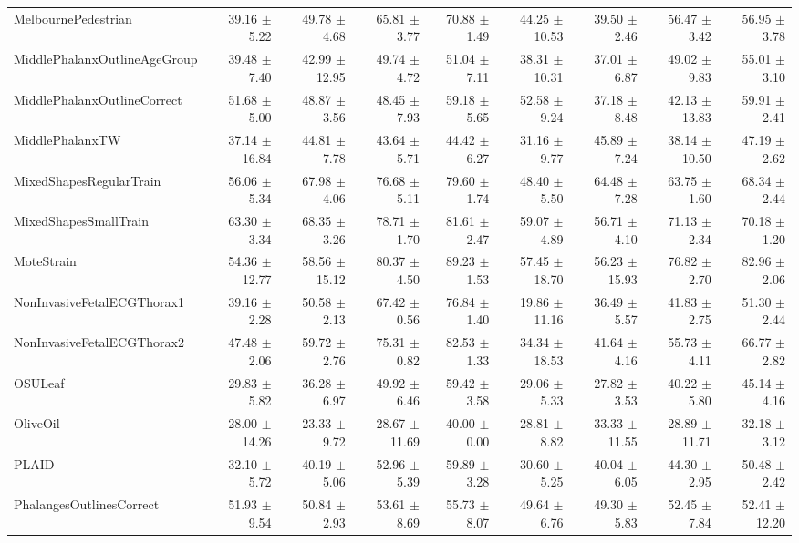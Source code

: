 \begin{landscape}
\begin{longtable}{lrrrrrrrr}
MelbournePedestrian & 39.16 $\pm$ 5.22 & 49.78 $\pm$ 4.68 & 65.81 $\pm$ 3.77 & 70.88 $\pm$ 1.49 & 44.25 $\pm$ 10.53 & 39.50 $\pm$ 2.46 & 56.47 $\pm$ 3.42 & 56.95 $\pm$ 3.78 \\
MiddlePhalanxOutlineAgeGroup & 39.48 $\pm$ 7.40 & 42.99 $\pm$ 12.95 & 49.74 $\pm$ 4.72 & 51.04 $\pm$ 7.11 & 38.31 $\pm$ 10.31 & 37.01 $\pm$ 6.87 & 49.02 $\pm$ 9.83 & 55.01 $\pm$ 3.10 \\
MiddlePhalanxOutlineCorrect & 51.68 $\pm$ 5.00 & 48.87 $\pm$ 3.56 & 48.45 $\pm$ 7.93 & 59.18 $\pm$ 5.65 & 52.58 $\pm$ 9.24 & 37.18 $\pm$ 8.48 & 42.13 $\pm$ 13.83 & 59.91 $\pm$ 2.41 \\
MiddlePhalanxTW & 37.14 $\pm$ 16.84 & 44.81 $\pm$ 7.78 & 43.64 $\pm$ 5.71 & 44.42 $\pm$ 6.27 & 31.16 $\pm$ 9.77 & 45.89 $\pm$ 7.24 & 38.14 $\pm$ 10.50 & 47.19 $\pm$ 2.62 \\
MixedShapesRegularTrain & 56.06 $\pm$ 5.34 & 67.98 $\pm$ 4.06 & 76.68 $\pm$ 5.11 & 79.60 $\pm$ 1.74 & 48.40 $\pm$ 5.50 & 64.48 $\pm$ 7.28 & 63.75 $\pm$ 1.60 & 68.34 $\pm$ 2.44 \\
MixedShapesSmallTrain & 63.30 $\pm$ 3.34 & 68.35 $\pm$ 3.26 & 78.71 $\pm$ 1.70 & 81.61 $\pm$ 2.47 & 59.07 $\pm$ 4.89 & 56.71 $\pm$ 4.10 & 71.13 $\pm$ 2.34 & 70.18 $\pm$ 1.20 \\
MoteStrain & 54.36 $\pm$ 12.77 & 58.56 $\pm$ 15.12 & 80.37 $\pm$ 4.50 & 89.23 $\pm$ 1.53 & 57.45 $\pm$ 18.70 & 56.23 $\pm$ 15.93 & 76.82 $\pm$ 2.70 & 82.96 $\pm$ 2.06 \\
NonInvasiveFetalECGThorax1 & 39.16 $\pm$ 2.28 & 50.58 $\pm$ 2.13 & 67.42 $\pm$ 0.56 & 76.84 $\pm$ 1.40 & 19.86 $\pm$ 11.16 & 36.49 $\pm$ 5.57 & 41.83 $\pm$ 2.75 & 51.30 $\pm$ 2.44 \\
NonInvasiveFetalECGThorax2 & 47.48 $\pm$ 2.06 & 59.72 $\pm$ 2.76 & 75.31 $\pm$ 0.82 & 82.53 $\pm$ 1.33 & 34.34 $\pm$ 18.53 & 41.64 $\pm$ 4.16 & 55.73 $\pm$ 4.11 & 66.77 $\pm$ 2.82 \\
OSULeaf & 29.83 $\pm$ 5.82 & 36.28 $\pm$ 6.97 & 49.92 $\pm$ 6.46 & 59.42 $\pm$ 3.58 & 29.06 $\pm$ 5.33 & 27.82 $\pm$ 3.53 & 40.22 $\pm$ 5.80 & 45.14 $\pm$ 4.16 \\
OliveOil & 28.00 $\pm$ 14.26 & 23.33 $\pm$ 9.72 & 28.67 $\pm$ 11.69 & 40.00 $\pm$ 0.00 & 28.81 $\pm$ 8.82 & 33.33 $\pm$ 11.55 & 28.89 $\pm$ 11.71 & 32.18 $\pm$ 3.12 \\
PLAID & 32.10 $\pm$ 5.72 & 40.19 $\pm$ 5.06 & 52.96 $\pm$ 5.39 & 59.89 $\pm$ 3.28 & 30.60 $\pm$ 5.25 & 40.04 $\pm$ 6.05 & 44.30 $\pm$ 2.95 & 50.48 $\pm$ 2.42 \\
PhalangesOutlinesCorrect & 51.93 $\pm$ 9.54 & 50.84 $\pm$ 2.93 & 53.61 $\pm$ 8.69 & 55.73 $\pm$ 8.07 & 49.64 $\pm$ 6.76 & 49.30 $\pm$ 5.83 & 52.45 $\pm$ 7.84 & 52.41 $\pm$ 12.20 \\

\end{longtable}
\end{landscape}
